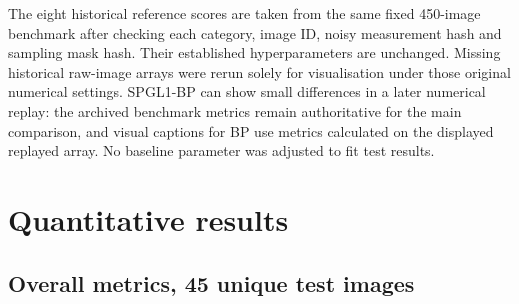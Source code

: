 \documentclass[10pt,a4paper]{article}
\begin{document}
The eight historical reference scores are taken from the
same fixed 450-image benchmark after checking each
category, image ID, noisy measurement hash and sampling
mask hash. Their established hyperparameters are unchanged.
Missing historical raw-image arrays were rerun solely for
visualisation under those original numerical settings.
SPGL1-BP can show small differences in a later numerical
replay: the archived benchmark metrics remain authoritative
for the main comparison, and visual captions for BP
use metrics calculated on the displayed replayed array.
No baseline parameter was adjusted to fit test results.

\section{Quantitative results}
\subsection*{Overall metrics, 45 unique test images}
\begin{table}[H]
\centering\tiny
{}
\caption{Means $\pm$ sample standard deviations over 45
\emph{distinct} images. This does not count the ten random
calibration draws as additional test images.}
\end{table}
\end{document}
